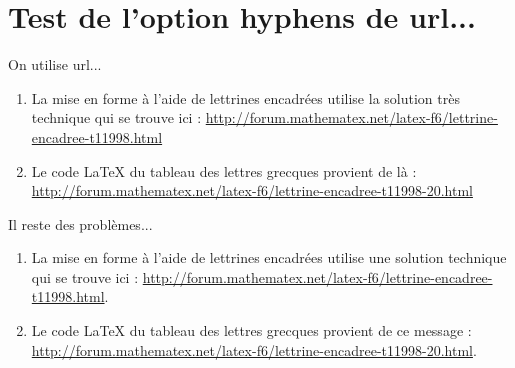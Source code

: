 \documentclass[10pt,a4paper]{article}
\begin{document}
\section*{Test de l'option hyphens de url...}

On utilise url...

\begin{enumerate}
	\item La mise en forme à l'aide de lettrines encadrées utilise la solution très technique qui se trouve ici : \url{http://forum.mathematex.net/latex-f6/lettrine-encadree-t11998.html}

	\item Le code \LaTeX{} du tableau des lettres grecques provient de là : \url{http://forum.mathematex.net/latex-f6/lettrine-encadree-t11998-20.html}
\end{enumerate}

Il reste des problèmes...

\begin{enumerate}
	\item La mise en forme à l'aide de lettrines encadrées utilise une solution technique qui se trouve ici : \url{http://forum.mathematex.net/latex-f6/lettrine-encadree-t11998.html}.

	\item Le code \LaTeX{} du tableau des lettres grecques provient de ce message : \url{http://forum.mathematex.net/latex-f6/lettrine-encadree-t11998-20.html}.
\end{enumerate}
\end{document}
